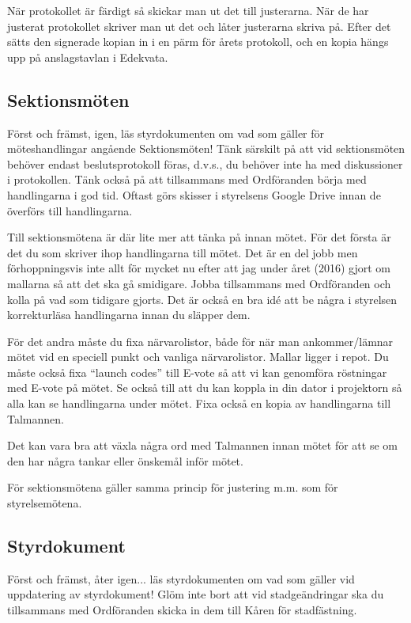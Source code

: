 \documentclass[10pt]{article}
\begin{document}
När protokollet är färdigt så skickar man ut det till justerarna. När de har justerat protokollet skriver man ut det och låter justerarna skriva på. Efter det sätts den signerade kopian in i en pärm för årets protokoll, och en kopia hängs upp på anslagstavlan i Edekvata.

\subsection{Sektionsmöten}
Först och främst, igen, läs styrdokumenten om vad som gäller för möteshandlingar angående Sektionsmöten! Tänk särskilt på att vid sektionsmöten behöver endast beslutsprotokoll föras, d.v.s., du behöver inte ha med diskussioner i protokollen. Tänk också på att tillsammans med Ordföranden börja med handlingarna i god tid. Oftast görs skisser i styrelsens Google Drive innan de överförs till handlingarna.

Till sektionsmötena är där lite mer att tänka på innan mötet. För det första är det du som skriver ihop handlingarna till mötet. Det är en del jobb men förhoppningsvis inte allt för mycket nu efter att jag under året (2016) gjort om mallarna så att det ska gå smidigare. Jobba tillsammans med Ordföranden och kolla på vad som tidigare gjorts. Det är också en bra idé att be några i styrelsen korrekturläsa handlingarna innan du släpper dem.

För det andra måste du fixa närvarolistor, både för när man ankommer/lämnar mötet vid en speciell punkt och vanliga närvarolistor. Mallar ligger i repot. Du måste också fixa ``launch codes'' till E-vote så att vi kan genomföra röstningar med E-vote på mötet. Se också till att du kan koppla in din dator i projektorn så alla kan se handlingarna under mötet. Fixa också en kopia av handlingarna till Talmannen.

Det kan vara bra att växla några ord med Talmannen innan mötet för att se om den har några tankar eller önskemål inför mötet.

För sektionsmötena gäller samma princip för justering m.m. som för styrelsemötena.

\subsection{Styrdokument}
Först och främst, åter igen... läs styrdokumenten om vad som gäller vid uppdatering av styrdokument! Glöm inte bort att vid stadgeändringar ska du tillsammans med Ordföranden skicka in dem till Kåren för stadfästning.
\end{document}
